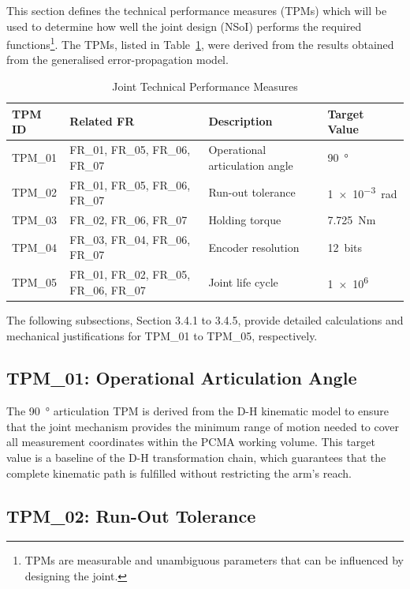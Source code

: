 This section defines the technical performance measures (TPMs) which will be used to determine how well the joint design (NSoI) performs the required functions\footnote{TPMs are measurable and unambiguous parameters that can be influenced by designing the joint.}. The TPMs, listed in Table~\ref{tab:TPMs}, were derived from the results obtained from the generalised error-propagation model. 
\begin{table}[H]
	\centering
	\caption{Joint Technical Performance Measures}
	\label{tab:TPMs}
	\begin{tabularx}{\textwidth}{|l|X|l|l|}
		\hline
		\textbf{TPM ID} & \textbf{Related FR} & \textbf{Description} & \textbf{Target Value} \\\hline
		TPM\_01 & FR\_01, FR\_05, FR\_06, FR\_07 & Operational articulation angle & \SI{90}{\degree} \\\hline
		TPM\_02 & FR\_01, FR\_05, FR\_06, FR\_07 & Run-out tolerance & \SI{1e-3}{rad} \\\hline
		TPM\_03 & FR\_02, FR\_06, FR\_07 & Holding torque & \SI{7.725}{Nm} \\\hline
		TPM\_04 & FR\_03, FR\_04, FR\_06, FR\_07 & Encoder resolution & \SI{12}{bits} \\\hline
		TPM\_05 & FR\_01, FR\_02, FR\_05, FR\_06, FR\_07 & Joint life cycle & \num{1e6}~\text{cycles} \\\hline
	\end{tabularx}
\end{table}
The following subsections, Section 3.4.1 to 3.4.5, provide detailed calculations and mechanical justifications for TPM\_01 to TPM\_05, respectively.

\subsection{TPM\_01: Operational Articulation Angle}

The \SI{90}{\degree} articulation TPM is derived from the D-H kinematic model to ensure that the joint mechanism provides the minimum range of motion needed to cover all measurement coordinates within the PCMA working volume. This target value is a baseline of the D-H transformation chain, which guarantees that the complete kinematic path is fulfilled without restricting the arm's reach.

\subsection{TPM\_02: Run-Out Tolerance}

